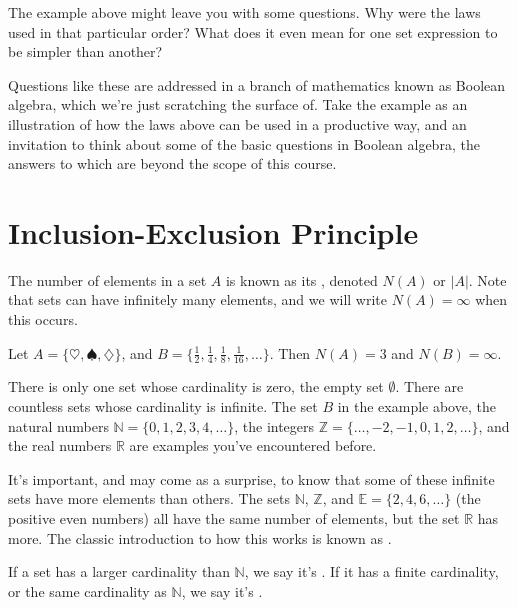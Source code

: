 \begin{remark}
The example above might leave you with some questions. Why were the laws used in that particular order? What does it even mean for one set expression to be simpler than another?

Questions like these are addressed in a branch of mathematics known as Boolean algebra, which we're just scratching the surface of. Take the example as an illustration of how the laws above can be used in a productive way, and an invitation to think about some of the basic questions in Boolean algebra, the answers to which are beyond the scope of this course.
\end{remark}

\section{Inclusion-Exclusion Principle}\label{InclusionExclusionSec}

The number of elements in a set $A$ is known as its , denoted $N(A)$ or $|A|$. Note that sets can have infinitely many elements, and we will write $N(A) = \infty$ when this occurs.

\begin{example}
Let $A = \{\heartsuit, \spadesuit, \diamondsuit\}$, and $B = \{\frac{1}{2}, \frac{1}{4},\frac{1}{8},\frac{1}{16}, \dots\}$. Then $N(A) = 3$ and $N(B) = \infty$.
\end{example}

There is only one set whose cardinality is zero, the empty set $\emptyset$. There are countless sets whose cardinality is infinite. The set $B$ in the example above, the natural numbers $\mathbb{N} = \{0,1,2,3,4,\dots\}$, the integers $\mathbb{Z} = \{\dots, -2, -1, 0 ,1 ,2, \dots\}$, and the real numbers $\mathbb{R}$ are examples you've encountered before.

It's important, and may come as a surprise, to know that some of these infinite sets have more elements than others. The sets $\mathbb{N}$, $\mathbb{Z}$, and $\mathbb{E} = \{2,4,6, \dots\}$ (the positive even numbers) all have the same number of elements, but the set $\mathbb{R}$ has more. The classic introduction to how this works is known as .

If a set has a larger cardinality than $\mathbb{N}$, we say it's . If it has a finite cardinality, or the same cardinality as $\mathbb{N}$, we say it's .

